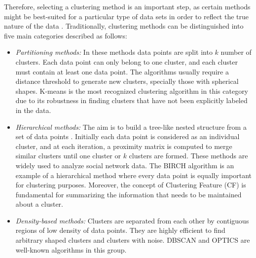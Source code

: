 Therefore, selecting a clustering method is an important step, as certain methods might be best-suited for a particular type of data sets in order to reflect the true nature of the data \cite{berkhin2006survey, han2011data}. Traditionally, clustering methods can be distinguished into five main categories described as follows: 


\begin{itemize}

    \item\textit{Partitioning methods:} In these methods data points are split into $k$ number of clusters. Each data point can only belong to one cluster, and each cluster must contain at least one data point. The algorithms usually require a distance threshold %
    to generate new clusters, specially those with spherical shapes.   %
    K-means is the most recognized clustering algorithm in this category due to its robustness in finding clusters that have not been explicitly labeled in the data.
    
    \item\textit{Hierarchical methods:} The aim is to build a tree-like nested structure from a set of data points \cite{swarndeep2016overview}. Initially each data point is considered as an individual cluster, and at each iteration, a proximity matrix is computed to merge similar clusters until one cluster or $k$ clusters are formed. These methods are widely used to analyze social network data. The BIRCH algorithm is an example of a hierarchical method where every data point is equally important for clustering purposes. Moreover, the concept of Clustering Feature (CF) is fundamental for summarizing the information that needs to be maintained about a cluster.
    
    
    \item\textit{Density-based methods:} Clusters are separated from each other by contiguous regions of low density of data points. They are highly efficient to find arbitrary shaped clusters and clusters with noise.  DBSCAN and OPTICS are well-known algorithms in this group.
    

\end{itemize}
